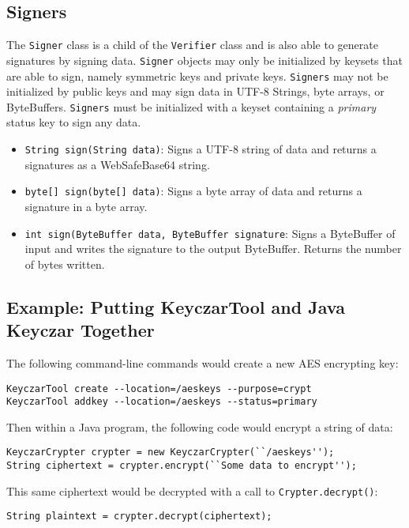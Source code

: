 \documentclass{llncs}
\begin{document}
\subsection{Signers}

The {\tt Signer} class is a child of the {\tt Verifier} class and is also able
to generate signatures by signing data. {\tt Signer} objects may only be
initialized by keysets that are able to sign, namely symmetric keys and private
keys. {\tt Signers} may not be initialized by public keys and may sign data in
UTF-8 Strings, byte arrays, or ByteBuffers. {\tt Signers} must be initialized
with a keyset containing a {\it primary} status key to sign any data.
\begin{itemize}
  \item {\tt String sign(String data)}: Signs a UTF-8 string of data and
  returns a signatures as a WebSafeBase64 string.
  \item {\tt byte[] sign(byte[] data)}: Signs a byte array of data and returns
  a signature in a byte array.
  \item {\tt int sign(ByteBuffer data, ByteBuffer signature}: Signs a
  ByteBuffer of input and writes the signature to the output ByteBuffer.
  Returns the number of bytes written.
\end{itemize}

\subsection{Example: Putting KeyczarTool and Java Keyczar Together}

The following command-line commands would create a new AES encrypting key:
\begin{verbatim}
KeyczarTool create --location=/aeskeys --purpose=crypt
KeyczarTool addkey --location=/aeskeys --status=primary
\end{verbatim}

Then within a Java program, the following code would encrypt a string of data:
\begin{verbatim}
KeyczarCrypter crypter = new KeyczarCrypter(``/aeskeys'');
String ciphertext = crypter.encrypt(``Some data to encrypt'');
\end{verbatim}

This same ciphertext would be decrypted with a call to {\tt Crypter.decrypt()}:
\begin{verbatim}
String plaintext = crypter.decrypt(ciphertext);
\end{verbatim}
\end{document}
